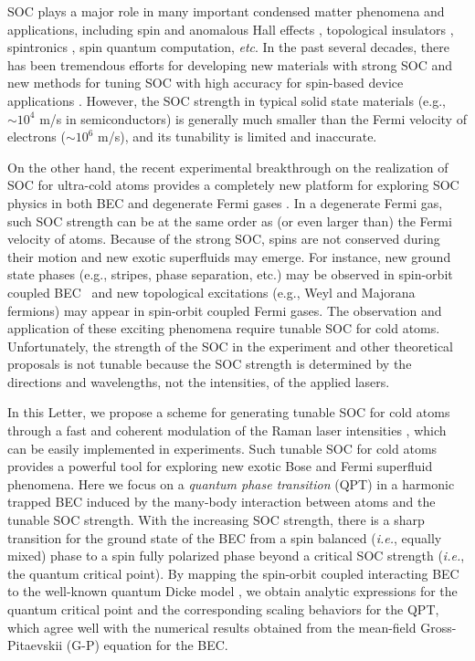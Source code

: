 \documentclass[prl,twocolumn,superscriptaddress,showpacs,floatfix]{revtex4}
\begin{document}

SOC plays a major role in many important condensed matter phenomena and
applications, including spin and anomalous Hall effects \cite{Xiao},
topological insulators \cite{Hasan}, spintronics \cite{Dassarma}, spin
quantum computation, \textit{etc}. In the past several decades, there has
been tremendous efforts for developing new materials with strong SOC and new
methods for tuning SOC with high accuracy for spin-based device applications
\cite{TuneSOC1,TuneSOC2}. However, the SOC strength in typical solid state
materials (e.g., $\sim 10^{4}$ m/s in semiconductors) is generally much
smaller than the Fermi velocity of electrons ($\sim 10^{6}$ m/s), and its
tunability is limited and inaccurate.

On the other hand, the recent experimental breakthrough on the realization
of SOC for ultra-cold atoms \cite{Lin} provides a completely new platform
for exploring SOC physics in both BEC \cite{Wu,Wang,Ho,Yongping,Hu,Santos}
and degenerate Fermi gases \cite{Zhang,DFG1,DFG2,DFG3}. In a degenerate
Fermi gas, such SOC strength can be at the same order as (or even larger
than) the Fermi velocity of atoms. Because of the strong SOC, spins are not
conserved during their motion and new exotic superfluids may emerge. For
instance, new ground state phases (e.g., stripes, phase separation, etc.)
may be observed in spin-orbit coupled BEC \cite{Wang,Ho,Yongping,Hu,Santos}\
and new topological excitations (e.g., Weyl \cite{DFG1} and Majorana \cite%
{Zhang} fermions) may appear in spin-orbit coupled Fermi gases. The
observation and application of these exciting phenomena require tunable SOC
for cold atoms. Unfortunately, the strength of the SOC in the experiment
\cite{Lin} and other theoretical proposals \cite%
{Ruseckas,Zhang2,Dalibard,Campbell} is not tunable because the SOC strength
is determined by the directions and wavelengths, not the intensities, of the
applied lasers.

In this Letter, we propose a scheme for generating tunable SOC for cold
atoms through a fast and coherent modulation of the Raman laser intensities
\cite{Grifoni}, which can be easily implemented in experiments. Such tunable
SOC for cold atoms provides a powerful tool for exploring new exotic Bose
and Fermi superfluid phenomena. Here we focus on a \textit{quantum phase
transition} (QPT) \cite{Sachdev} in a harmonic trapped BEC induced by the
many-body interaction between atoms and the tunable SOC strength. With the
increasing SOC strength, there is a sharp transition for the ground state of
the BEC from a spin balanced (\textit{i.e.}, equally mixed) phase to a spin
fully polarized phase beyond a critical SOC strength (\textit{i.e.}, the
quantum critical point). By mapping the spin-orbit coupled interacting BEC
to the well-known quantum Dicke model \cite{Dicke,Emary}, we obtain analytic
expressions for the quantum critical point and the corresponding scaling
behaviors for the QPT, which agree well with the numerical results obtained
from the mean-field Gross-Pitaevskii (G-P) equation for the BEC.
\end{document}
